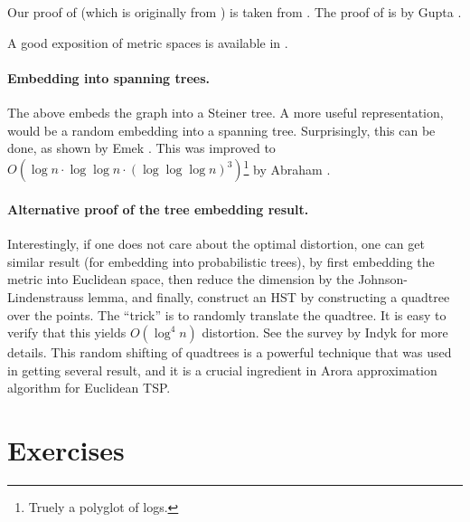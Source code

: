 Our proof of  (which is originally from
\cite{frt-tbaam-04}) is taken from \cite{klmn-mdnem-05}. The proof of
 is by Gupta \cite{g-efm-00}.

A good exposition of metric spaces is available in \Matousek{}
\cite{m-ldg-02}. 


\paragraph*{Embedding into spanning trees.}

The above embeds the graph into a Steiner tree. A more useful
representation, would be a random embedding into a spanning
tree. Surprisingly, this can be done, as shown by \si{Emek} \etal
\cite{eest-lsst-08}. This was improved to
$O( \log n \cdot \log \log n \cdot ( \log \log \log n)^3
)$\footnote{Truely a polyglot of logs.} by Abraham \etal
\cite{abn-ntlss-08, abn-ntlsst-08-arxiv}.

\paragraph*{Alternative proof of the tree embedding result.}

Interestingly, if one does not care about the optimal distortion, one
can get similar result (for embedding into probabilistic trees), by
first embedding the metric into Euclidean space, then reduce the
dimension by the Johnson-Lindenstrauss lemma, and finally, construct
an HST by constructing a quadtree over the points. The ``trick'' is to
randomly translate the quadtree. It is easy to verify that this yields
$O( \log^4 n)$ distortion. See the survey by Indyk \cite{i-aaldg-01}
for more details. This random shifting of quadtrees is a powerful
technique that was used in getting several result, and it is a crucial
ingredient in Arora \cite{a-ptase-98} approximation algorithm for
Euclidean TSP.








\section{Exercises}

